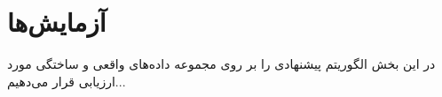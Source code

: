 \chapter{آزمایش‌ها}\label{Chap:Chap4}

در این بخش الگوریتم پیشنهادی را بر روی مجموعه داده‌های واقعی و ساختگی مورد ارزیابی قرار می‌دهیم... 


